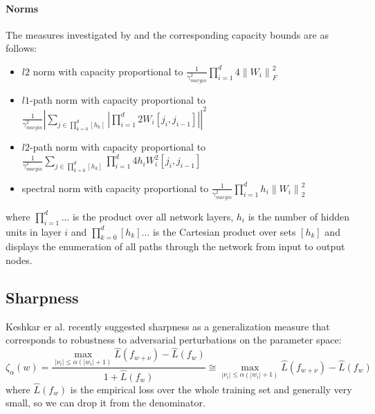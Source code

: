 \paragraph{Norms}
The measures investigated by \cite{neyshabur2017exploring} and the corresponding capacity bounds are as follows:
%
\begin{itemize}
	\item $l2$ norm with capacity proportional to $\frac{1}{\gamma_{margin}^2} \prod_{i=1}^{d} 4 \left\| W_i  \right\|_F^2$ \inlineeqno
	\item $l1$-path norm with capacity proportional to $\frac{1}{\gamma_{margin}^2} \left| \sum_{j \in \prod_{k=0}^d[h_k]}^{} \left| \prod_{i=1}^{d} 2 W_i [j_i, j_{i-1}] \right|\right|^2$ \inlineeqno
	\item $l2$-path norm with capacity proportional to $\frac{1}{\gamma_{margin}^2} \sum_{j \in \prod_{k=0}^d[h_k]}^{} \prod_{i=1}^{d} 4 h_i W_i^2 [j_i, j_{i-1}]$ \inlineeqno
	\item spectral norm with capacity proportional to $\frac{1}{\gamma_{margin}^2} \prod_{i=1}^{d} h_i \left\| W_i  \right\|_2^2$ \inlineeqno
\end{itemize}
where $\prod_{i=1}^{d}\dots$ is the product over all network layers, $h_i$ is the number of hidden units in layer $i$ and $\prod_{k=0}^d[h_k]\dots$ is the Cartesian product over sets $[h_k]$ and displays the enumeration of all paths through the network from input to output nodes.
%
\subsection{Sharpness}
Keshkar er al. \cite{DBLP:journals/corr/KeskarMNST16} recently suggested sharpness as a generalization measure that corresponds to robustness to adversarial perturbations on the parameter space:
%
\begin{equation}
\zeta _\alpha (w) = \frac{\max_{\left| \nu_i \right| \le \alpha(\left| w_i  \right| + 1) }\hat{L}(f_{w + \nu}) - \hat{L}(f_w)}{1 + \hat{L}(f_w)} \cong \max_{\left| \nu_i \right| \le \alpha(\left| w_i  \right| + 1) }\hat{L}(f_{w + \nu}) - \hat{L}(f_w)
\end{equation}
% 
where $\hat{L}(f_{w})$ is the empirical loss over the whole training set and generally very small, so we can drop it from the denominator.
